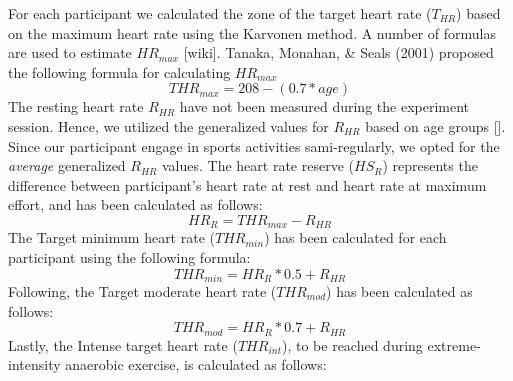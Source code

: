 For each participant we calculated the zone of the target heart rate (\begin{math} T_{HR}\end{math}) based on the maximum heart rate using the Karvonen method. A number of formulas are used to estimate  \begin{math} HR_{max}\end{math} [wiki]. Tanaka, Monahan, \& Seals (2001) proposed the following formula for calculating \begin{math}HR_{max}\end{math}\\
\begin{equation}
THR_{max} = 208-(0.7 * age)
\end{equation}The resting heart rate \begin{math} R_{HR}\end{math} have not been measured during the experiment session. Hence, we utilized the generalized values for \begin{math} R_{HR}\end{math} based on age groups []. Since our participant engage in sports activities sami-regularly, we opted for the \textit{average} generalized \begin{math} R_{HR}\end{math} values. The heart rate reserve (\begin{math} HS_{R}\end{math}) represents the difference between participant's heart rate at rest and heart rate at maximum effort, and has been calculated as follows: \begin{equation}
HR_{R} = THR_{max} - R_{HR} 
\end{equation}The Target minimum heart rate (\begin{math} THR_{min}\end{math}) has been calculated for each participant using the following formula:\begin{equation}
THR_{min} =  HR_{R}*0.5 + R_{HR} 
\end{equation}
Following, the Target moderate heart rate (\begin{math} THR_{mod}\end{math}) has been calculated as follows:\begin{equation}
THR_{mod} =  HR_{R}*0.7 + R_{HR} 
\end{equation}Lastly, the Intense target heart rate (\begin{math} THR_{int}\end{math}), to be reached during extreme-intensity anaerobic exercise, is calculated as follows: 
